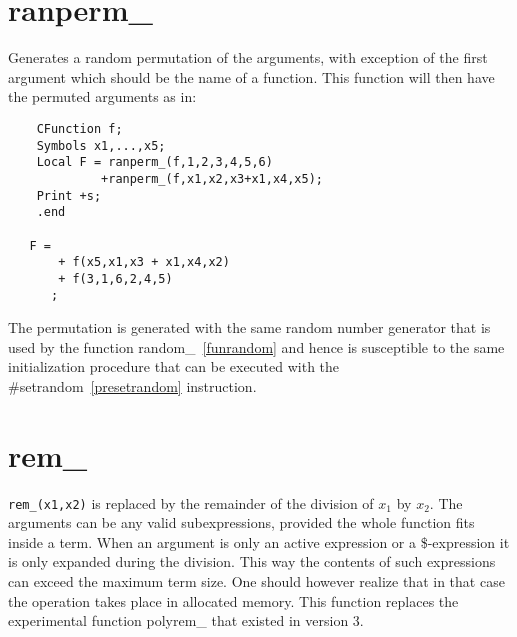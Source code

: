 
\section{ranperm\_}
\label{funranperm}
\noindent Generates a random permutation of the arguments, with exception 
of the first argument which should be the name of a function. This function 
will then have the permuted arguments as in:
\begin{verbatim}
    CFunction f;
    Symbols x1,...,x5;
    Local F = ranperm_(f,1,2,3,4,5,6)
             +ranperm_(f,x1,x2,x3+x1,x4,x5);
    Print +s;
    .end

   F =
       + f(x5,x1,x3 + x1,x4,x2)
       + f(3,1,6,2,4,5)
      ;
\end{verbatim}
The permutation is generated with the same random number generator that is 
used by the function 
random\_~\ref{funrandom} and hence 
is susceptible to the same initialization procedure that can be executed 
with the \#setrandom~\ref{presetrandom} instruction.


\section{rem\_}
\label{funrem}
\noindent \verb:rem_(x1,x2): is replaced by the remainder of the division 
of $x_1$ by $x_2$. The arguments can be any valid subexpressions, provided 
the whole function fits inside a term. When an argument is only an active 
expression or a \$-expression it is only expanded during the division. This 
way the contents of such expressions can exceed the maximum term size. One 
should however realize that in that case the operation takes place in 
allocated memory.
This function replaces the experimental function 
polyrem\_ that existed in 
version 3.


